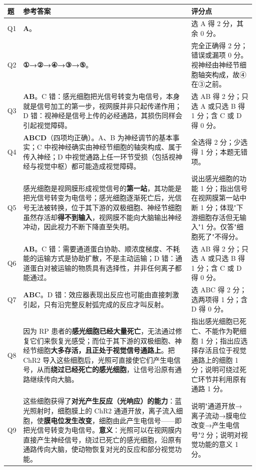 \documentclass[UTF8,a4paper,11pt]{ctexart}
\begin{document}
\begin{longtable}{@{}p{0.85cm}p{9.7cm}p{4.2cm}@{}}
\toprule
\textbf{题} & \textbf{参考答案} & \textbf{评分点} \\
\midrule
\endhead
Q1 & \textbf{A}。 & 选 A 得 2 分，其余 0 分。 \\
\addlinespace
Q2 & \textbf{①→②→④→③→⑤}。 & 完全正确得 2 分；错误或漏项 0 分。视神经由神经节细胞轴突构成，故④在③之前。 \\
\addlinespace
Q3 & \textbf{AB}。C 错：感光细胞把光信号转变为电信号，本身就是信号加工的第一步，视网膜并非只起传递作用；D 错：视神经是信号上传的必经通路，其损伤同样会引起视觉障碍。 & 选 AB 得 2 分；只选 A 或只选 B 得 1 分；含 C 或 D 得 0 分。 \\
\addlinespace
Q4 & \textbf{ABCD}（四项均正确）。A、B 为神经调节的基本事实；C 中视神经确实由神经节细胞的轴突构成、属于传入神经；D 中视觉通路上任一环节受损（包括视神经与视觉中枢）都可能造成视觉障碍。 & 全选得 2 分；少选得 1 分；本题无错项。 \\
\addlinespace
Q5 & 感光细胞是视网膜形成视觉信号的\textbf{第一站}，其功能是把光信号转变为电信号；感光细胞逐渐死亡后，光信号无法被转换，位于其下游的双极细胞、神经节细胞虽然存活却\textbf{得不到输入}，视网膜不能向大脑输出神经冲动，因此视力不断下降直至失明。 & 说出感光细胞的功能 1 分；指出信号在视网膜第一站中断 1 分；体现"下游细胞存活但无输入"1 分。仅答"细胞死了"不得分。 \\
\addlinespace
Q6 & \textbf{AB}。C 错：需要通道蛋白协助、顺浓度梯度、不耗能的运输方式是协助扩散，不是主动运输；D 错：通道蛋白对被运输的物质具有选择性，并非任何离子都能通过。 & 选 AB 得 2 分；只选 A 或只选 B 得 1 分；含 C 或 D 得 0 分。 \\
\addlinespace
Q7 & \textbf{ABC}。D 错：效应器表现出反应也可能由直接刺激引起，只有沿完整反射弧完成的反应才叫反射。 & 选 ABC 得 2 分；选两项得 1 分；含 D 得 0 分。 \\
\addlinespace
Q8 & 因为 RP 患者的\textbf{感光细胞已经大量死亡}，无法通过修复它们来恢复光感受；而位于其下游的双极细胞、神经节细胞\textbf{大多存活，且正处于视觉信号通路上}。把 ChR2 导入这些细胞后，光照可直接使它们产生电信号，从而\textbf{绕过已经死亡的感光细胞}，让信号沿原有通路继续传向大脑。 & 指出感光细胞已死亡、不能作为靶细胞 1 分；指出应选择存活且位于视觉通路上的细胞 1 分；说明可绕过死亡环节并利用原有通路 1 分。 \\
\addlinespace
Q9 & 这些细胞获得了\textbf{对光产生反应（光响应）的能力}：蓝光照射时，细胞膜上的 ChR2 通道开放，离子流入细胞，使\textbf{膜电位发生改变}，细胞由此产生电信号——即把光信号转变为电信号。\textbf{意义}：光照可以在视网膜内直接产生神经信号，绕过已死亡的感光细胞，沿原有通路传向大脑，使动物恢复对光的反应和部分视觉功能。 & 说明"通道开放→离子流动→膜电位改变→产生电信号"2 分；说明对视觉功能的意义 1 分。 \\

\end{longtable}
\end{document}
